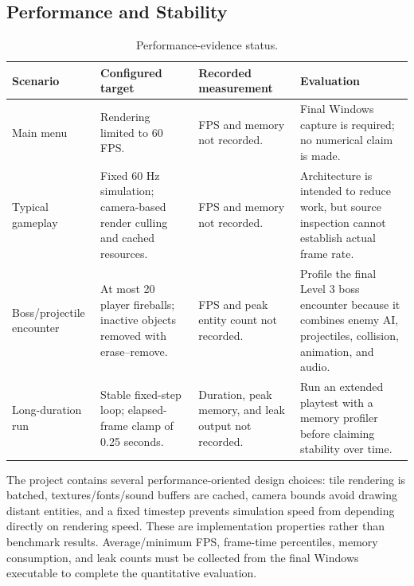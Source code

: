 \documentclass{template}
\begin{document}
\normalsize

\subsection{Performance and Stability}

\begin{table}[H]
    \centering
    \caption{Performance-evidence status.}
    \label{tab:performance}
    \small
    \begin{tabularx}{\textwidth}{@{}
        >{\raggedright\arraybackslash}p{2.8cm}
        >{\raggedright\arraybackslash}p{3.6cm}
        >{\raggedright\arraybackslash}p{3.1cm}
        >{\raggedright\arraybackslash}X@{}}
        \toprule
        \textbf{Scenario} & \textbf{Configured target} &
        \textbf{Recorded measurement} & \textbf{Evaluation} \\
        \midrule
        Main menu & Rendering limited to 60 FPS. & FPS and memory not recorded.
        & Final Windows capture is required; no numerical claim is made. \\
        Typical gameplay & Fixed 60 Hz simulation; camera-based render culling
        and cached resources. & FPS and memory not recorded. & Architecture is
        intended to reduce work, but source inspection cannot establish actual
        frame rate. \\
        Boss/projectile encounter & At most 20 player fireballs; inactive
        objects removed with erase--remove. & FPS and peak entity count not
        recorded. & Profile the final Level 3 boss encounter because it combines
        enemy AI, projectiles, collision, animation, and audio. \\
        Long-duration run & Stable fixed-step loop; elapsed-frame clamp of 0.25
        seconds. & Duration, peak memory, and leak output not recorded. & Run an
        extended playtest with a memory profiler before claiming stability over
        time. \\
        \bottomrule
    \end{tabularx}
\end{table}

The project contains several performance-oriented design choices: tile
rendering is batched, textures/fonts/sound buffers are cached, camera bounds
avoid drawing distant entities, and a fixed timestep prevents simulation speed
from depending directly on rendering speed. These are implementation
properties rather than benchmark results. Average/minimum FPS, frame-time
percentiles, memory consumption, and leak counts must be collected from the
final Windows executable to complete the quantitative evaluation.
\end{document}
